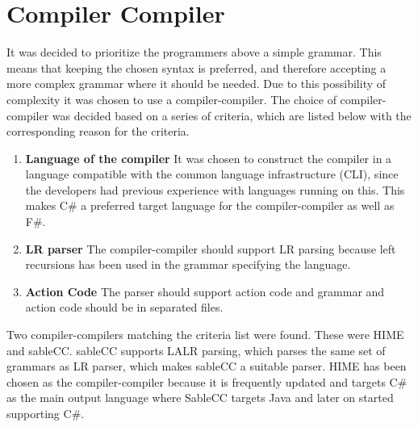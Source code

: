 \section{Compiler Compiler}
\label{sec:compiler_compiler_choice}

It was decided to prioritize the programmers above a simple grammar. This means that keeping the chosen syntax is preferred, and therefore accepting a more complex grammar where it should be needed. Due to this possibility of complexity it was chosen to use a compiler-compiler. The choice of compiler-compiler was decided based on a series of criteria, which are listed below with the corresponding reason for the criteria.

\begin{enumerate}
\item \textbf{Language of the compiler} It was chosen to construct the compiler in a language compatible with the common language infrastructure (CLI), since the developers had previous experience with languages running on this. This makes C\# a preferred target language for the compiler-compiler as well as F\#.

\item \textbf{LR parser} The compiler-compiler should support LR parsing because left recursions has been used in the grammar specifying the language.\\

\item \textbf{Action Code} The parser should support action code and grammar and action code should be in separated files.\\

\end{enumerate}

Two compiler-compilers matching the criteria list were found. These were HIME and sableCC. sableCC supports LALR parsing, which parses the same set of grammars as LR parser, which makes sableCC a suitable parser. HIME has been chosen as the compiler-compiler because it is frequently updated and targets C\# as the main output language where SableCC targets Java and later on started supporting C\#.